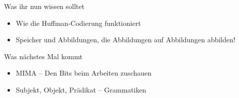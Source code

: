 \begin{frame}	
	\begin{block}{Was ihr nun wissen solltet}
		\begin{itemize}
			\item Wie die Huffman-Codierung funktioniert
			\item Speicher und Abbildungen, die Abbildungen auf Abbildungen abbilden!
		\end{itemize}
	\end{block}
	
	\begin{block}{Was nächstes Mal kommt}
		\begin{itemize}
			\item MIMA – Den Bits beim Arbeiten zuschauen
			\item Subjekt, Objekt, Prädikat – Grammatiken
		\end{itemize}
	\end{block}
\end{frame}


\slideThanks

